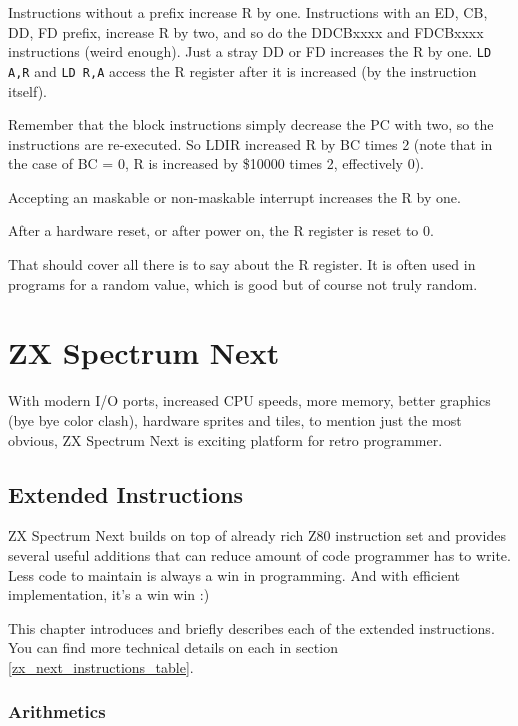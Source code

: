 \documentclass[oneside,a4paper]{book}
\begin{document}
Instructions without a prefix increase R by one. Instructions with an ED, CB, DD, FD prefix, increase R by two, and so do the DDCBxxxx and FDCBxxxx instructions (weird enough). Just a stray DD or FD increases the R by one. {\tt LD A,R} and {\tt LD R,A} access the R register after it is increased (by the instruction itself). 

Remember that the block instructions simply decrease the PC with two, so the instructions are re-executed. So LDIR increased R by BC times 2 (note that in the case of BC = 0, R is increased by \$10000 times 2, effectively 0).

Accepting an maskable or non-maskable interrupt increases the R by one.

After a hardware reset, or after power on, the R register is reset to 0.

That should cover all there is to say about the R register. It is often used in programs for a random value, which is good but of course not truly random.




\chapter{ZX Spectrum Next}

With modern I/O ports, increased CPU speeds, more memory, better graphics (bye bye color clash), hardware sprites and tiles, to mention just the most obvious, ZX Spectrum Next is exciting platform for retro programmer.


\section{Extended Instructions}

ZX Spectrum Next builds on top of already rich Z80 instruction set and provides several useful additions that can reduce amount of code programmer has to write. Less code to maintain is always a win in programming. And with efficient implementation, it's a win win :)

This chapter introduces and briefly describes each of the extended instructions. You can find more technical details on each in section \ref{zx_next_instructions_table}.

\newcommand\instritem[1]{\item[{\tt #1}] \hfill}

\subsection{Arithmetics}
\end{document}
